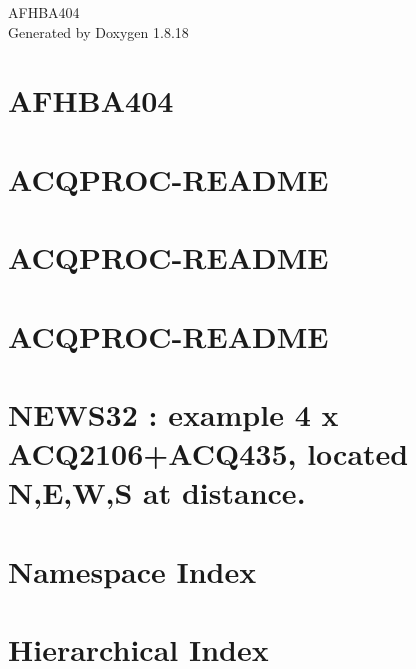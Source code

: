 \let\mypdfximage\pdfximage\def\pdfximage{\immediate\mypdfximage}\documentclass[twoside]{book}
\newcommand{\+}{\discretionary{\mbox{\scriptsize$\hookleftarrow$}}{}{}}
\newcommand{\clearemptydoublepage}{%
  \newpage{\pagestyle{empty}\cleardoublepage}%
}
\begin{document}
\hypersetup{pageanchor=false,
             bookmarksnumbered=true,
             pdfencoding=unicode
            }
\begin{titlepage}
\vspace*{7cm}
\begin{center}%
{\Large A\+F\+H\+B\+A404 }\\
\vspace*{1cm}
{\large Generated by Doxygen 1.8.18}\\
\end{center}
\end{titlepage}
\clearemptydoublepage
{}
\tableofcontents
\clearemptydoublepage
{}
\hypersetup{pageanchor=true}

\chapter{A\+F\+H\+B\+A404}
\label{index}\hypertarget{index}{}
\chapter{A\+C\+Q\+P\+R\+O\+C-\/\+R\+E\+A\+D\+ME}
\label{md_ACQPROC-README}

\chapter{A\+C\+Q\+P\+R\+O\+C-\/\+R\+E\+A\+D\+ME}
\label{md_ACQPROC_ACQPROC-README}

\chapter{A\+C\+Q\+P\+R\+O\+C-\/\+R\+E\+A\+D\+ME}
\label{md_ACQPROC_local-ACQPROC-README}

\chapter{N\+E\+W\+S32 \+: example 4 x A\+C\+Q2106+\+A\+C\+Q435, located N,E,W,S at distance.}
\label{md_ACQPROC_README_8NEWS32}

\chapter{Namespace Index}

\chapter{Hierarchical Index}

\end{document}
